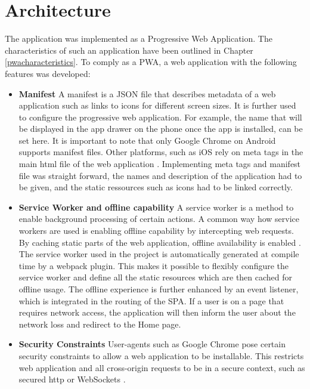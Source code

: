 \section{Architecture\label{architecture}}
The application was implemented as a Progressive Web Application. The characteristics of such an application have been outlined in Chapter \ref{pwacharacteristics}. To comply as a PWA, a web application with the following features was developed:
\begin{itemize}
\item \textbf{Manifest}
A manifest is a JSON file that describes metadata of a web application such as links to icons for different screen sizes. It is further used to configure the progressive web application. For example, the name that will be displayed in the app drawer on the phone once the app is installed, can be set here. It is important to note that only Google Chrome on Android supports manifest files. \cite{manifest} Other platforms, such as iOS rely on meta tags in the main html file of the web application \cite{applemetatags}. Implementing meta tags and manifest file was straight forward, the names and description of the application had to be given, and the static ressources such as icons had to be linked correctly.
\item \textbf{Service Worker and offline capability}
A service worker is a method to enable background processing of certain actions. A common way how service workers are used is enabling offline capability by intercepting web requests. By caching static parts of the web application, offline availability is enabled \cite{serviceworkers}. The service worker used in the project is automatically generated at compile time by a webpack plugin. This makes it possible to flexibly configure the service worker and define all the static resources which are then cached for offline usage. The offline experience is further enhanced by an event listener, which is integrated in the routing of the SPA. If a user is on a page that requires network access, the application will then inform the user about the network loss and redirect to the Home page.

\item \textbf{Security Constraints}
User-agents such as Google Chrome pose certain security constraints to allow a web application to be installable. This restricts web application and all cross-origin requests to be in a secure context, such as secured http or WebSockets \cite{manifest} \cite{securitychrome}.
\end{itemize}

